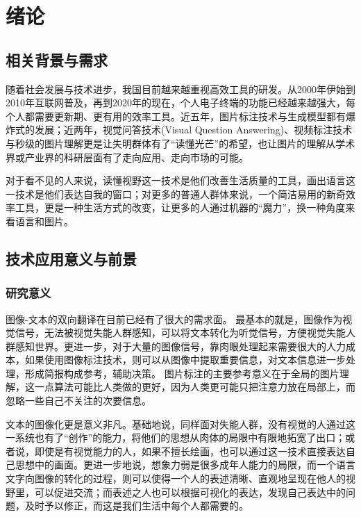 
\chapter{绪论}

\section{相关背景与需求}
随着社会发展与技术进步，我国目前越来越重视高效工具的研发。从2000年伊始到2010年互联网普及，再到2020年的现在，个人电子终端的功能已经越来越强大，每个人都需要更新期、更有用的效率工具。近五年，图片标注技术与生成模型都有爆炸式的发展；近两年，视觉问答技术(Visual Question Answering)、视频标注技术与秒级的图片理解更是让失明群体有了“读懂光芒”的希望，也让图片的理解从学术界或产业界的科研层面有了走向应用、走向市场的可能。

对于看不见的人来说，读懂视野这一技术是他们改善生活质量的工具，画出语言这一技术是他们表达自我的窗口；对更多的普通人群体来说，一个简洁易用的新奇效率工具，更是一种生活方式的改变，让更多的人通过机器的“魔力”，换一种角度来看语言和图片。

\section{技术应用意义与前景}

\subsection{研究意义}
图像-文本的双向翻译在目前已经有了很大的需求面。
最基本的就是，图像作为视觉信号，无法被视觉失能人群感知，可以将文本转化为听觉信号，方便视觉失能人群感知世界。更进一步，对于大量的图像信号，靠肉眼处理起来需要很大的人力成本，如果使用图像标注技术，则可以从图像中提取重要信息，对文本信息进一步处理，形成简报构成参考，辅助决策。
图片标注的主要参考意义在于全局的图片理解，这一点算法可能比人类做的更好，因为人类更可能只把注意力放在局部上，而忽略一些自己不关注的次要信息。


文本的图像化更是意义非凡。基础地说，同样面对失能人群，没有视觉的人通过这一系统也有了“创作”的能力，将他们的思想从肉体的局限中有限地拓宽了出口；或者说，即使是有视觉能力的人，如果不擅长绘画，也可以通过这一技术直接表达自己思想中的画面。更进一步地说，想象力弱是很多成年人能力的局限，而一个语言文字向图像的转化的过程，则可以使得一个人的表述清晰、直观地呈现在他人的视野里，可以促进交流；而表述之人也可以根据可视化的表达，发现自己表达中的问题，及时予以修正，而这是我们生活中每个人都需要的。

